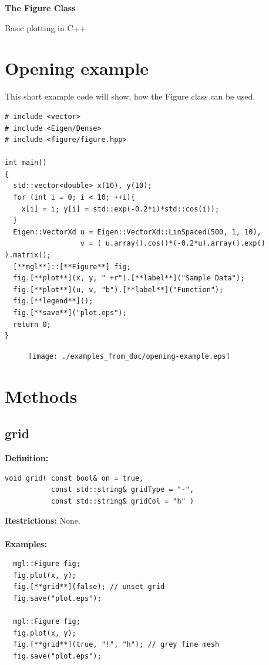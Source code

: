 \documentclass[a4paper]{article}
\newcommand{\command}[1]{\subsection{#1}}
\begin{document}
\begin{center}
  \begin{huge}
    \textbf{The Figure Class\\}
  \end{huge}
  Basic plotting in C++
\end{center}
  
\vspace*{3cm}
  \tableofcontents
\vspace*{\fill}


\section{Opening example}

This short example code will show, how the Figure class can be used.
\begin{lstlisting}
# include <vector>
# include <Eigen/Dense>
# include <figure/figure.hpp>

int main()
{
  std::vector<double> x(10), y(10);
  for (int i = 0; i < 10; ++i){ 
    x[i] = i; y[i] = std::exp(-0.2*i)*std::cos(i));
  }
  Eigen::VectorXd u = Eigen::VectorXd::LinSpaced(500, 1, 10),
                  v = ( u.array().cos()*(-0.2*u).array().exp() ).matrix();
  [**mgl**]::[**Figure**] fig;
  fig.[**plot**](x, y, " +r").[**label**]("Sample Data");
  fig.[**plot**](u, v, "b").[**label**]("Function");
  fig.[**legend**]();
  fig.[**save**]("plot.eps");
  return 0;
}
\end{lstlisting}

\begin{figure}[h]
  \centering
  \texttt{[image: ./examples\_from\_doc/opening-example.eps]}
  \thispagestyle{empty}
\end{figure}

\restoregeometry
\section{Methods}

\command{grid}

\textbf{Definition:}
\begin{lstlisting}
void grid( const bool& on = true, 
           const std::string& gridType = "-", 
           const std::string& gridCol = "h" )
\end{lstlisting}
%
\textbf{Restrictions:} None. \\ \\
%
\textbf{Examples:}
\begin{lstlisting}
  mgl::Figure fig;
  fig.plot(x, y);
  fig.[**grid**](false); // unset grid
  fig.save("plot.eps");

  mgl::Figure fig;
  fig.plot(x, y);
  fig.[**grid**](true, "!", "h"); // grey fine mesh
  fig.save("plot.eps");
\end{lstlisting}
\end{document}
